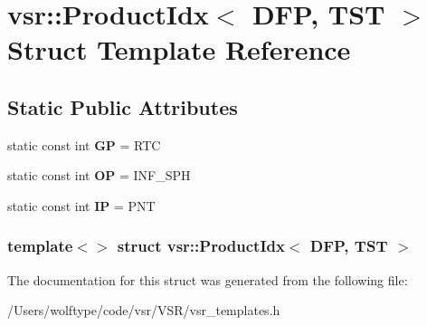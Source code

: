 \hypertarget{structvsr_1_1_product_idx_3_01_d_f_p_00_01_t_s_t_01_4}{\section{vsr\-:\-:Product\-Idx$<$ D\-F\-P, T\-S\-T $>$ Struct Template Reference}
\label{structvsr_1_1_product_idx_3_01_d_f_p_00_01_t_s_t_01_4}
}
\subsection*{Static Public Attributes}
\begin{DoxyCompactItemize}
\item 
\hypertarget{structvsr_1_1_product_idx_3_01_d_f_p_00_01_t_s_t_01_4_a0c7444e0e2f91a39f86d7525d40090e9}{static const int {\bfseries G\-P} = R\-T\-C}\label{structvsr_1_1_product_idx_3_01_d_f_p_00_01_t_s_t_01_4_a0c7444e0e2f91a39f86d7525d40090e9}

\item 
\hypertarget{structvsr_1_1_product_idx_3_01_d_f_p_00_01_t_s_t_01_4_a94a09567153a3c8ba7b681a394c52e01}{static const int {\bfseries O\-P} = I\-N\-F\-\_\-\-S\-P\-H}\label{structvsr_1_1_product_idx_3_01_d_f_p_00_01_t_s_t_01_4_a94a09567153a3c8ba7b681a394c52e01}

\item 
\hypertarget{structvsr_1_1_product_idx_3_01_d_f_p_00_01_t_s_t_01_4_a2714419ce86b130fd01a59b074ed99b3}{static const int {\bfseries I\-P} = P\-N\-T}\label{structvsr_1_1_product_idx_3_01_d_f_p_00_01_t_s_t_01_4_a2714419ce86b130fd01a59b074ed99b3}

\end{DoxyCompactItemize}
\subsubsection*{template$<$$>$ struct vsr\-::\-Product\-Idx$<$ D\-F\-P, T\-S\-T $>$}



The documentation for this struct was generated from the following file\-:\begin{DoxyCompactItemize}
\item 
/\-Users/wolftype/code/vsr/\-V\-S\-R/vsr\-\_\-templates.\-h\end{DoxyCompactItemize}

